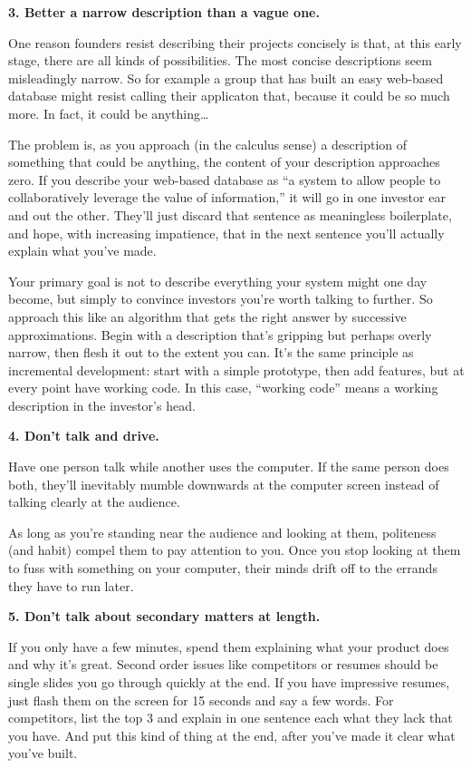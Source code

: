 \textbf{3. Better a narrow description than a vague one.}

One reason founders resist describing their projects concisely is that,
at this early stage, there are all kinds of possibilities. The most
concise descriptions seem misleadingly narrow. So for example a group
that has built an easy web-based database might resist calling their
applicaton that, because it could be so much more. In fact, it could be
anything\ldots{}

The problem is, as you approach (in the calculus sense) a description of
something that could be anything, the content of your description
approaches zero. If you describe your web-based database as ``a system
to allow people to collaboratively leverage the value of information,''
it will go in one investor ear and out the other. They'll just discard
that sentence as meaningless boilerplate, and hope, with increasing
impatience, that in the next sentence you'll actually explain what
you've made.

Your primary goal is not to describe everything your system might one
day become, but simply to convince investors you're worth talking to
further. So approach this like an algorithm that gets the right answer
by successive approximations. Begin with a description that's gripping
but perhaps overly narrow, then flesh it out to the extent you can. It's
the same principle as incremental development: start with a simple
prototype, then add features, but at every point have working code. In
this case, ``working code'' means a working description in the
investor's head.

\textbf{4. Don't talk and drive.}

Have one person talk while another uses the computer. If the same person
does both, they'll inevitably mumble downwards at the computer screen
instead of talking clearly at the audience.

As long as you're standing near the audience and looking at them,
politeness (and habit) compel them to pay attention to you. Once you
stop looking at them to fuss with something on your computer, their
minds drift off to the errands they have to run later.

\textbf{5. Don't talk about secondary matters at length.}

If you only have a few minutes, spend them explaining what your product
does and why it's great. Second order issues like competitors or resumes
should be single slides you go through quickly at the end. If you have
impressive resumes, just flash them on the screen for 15 seconds and say
a few words. For competitors, list the top 3 and explain in one sentence
each what they lack that you have. And put this kind of thing at the
end, after you've made it clear what you've built.

